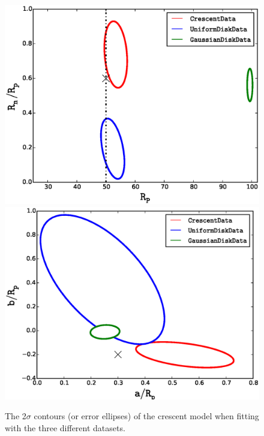 \begin{figure}
\centering
  \includegraphics[width=0.9\hsize]{plots/Rhalf_RnRp.eps}
  \includegraphics[width=0.9\hsize]{plots/aRp_bRp.eps}
\caption{\label{fig:mcmc} The 2$\sigma$ contours (or error ellipses)
  of the crescent model when fitting with the three different
  datasets.}
\end{figure}

